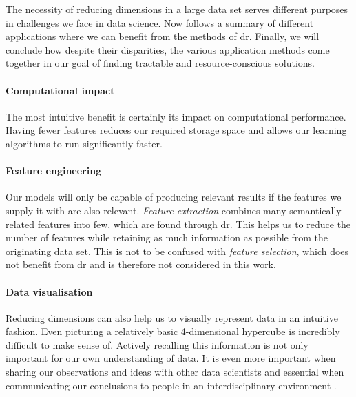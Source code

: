 The necessity of reducing dimensions in a large data set serves different purposes in challenges we face in data science. 
Now follows a summary of different applications where we can benefit from the methods of \acrlong{dr}.
Finally, we will conclude how despite their disparities, the various application methods come together in our goal of finding tractable and resource-conscious solutions.

\paragraph{Computational impact}

The most intuitive benefit is certainly its impact on computational performance.
Having fewer features reduces our required storage space and allows our learning algorithms to run significantly faster. \cite{PythonMachineLearningCh1}
\vspace{-5mm}

\paragraph{Feature engineering}

Our models will only be capable of producing relevant results if the features we supply it with are also relevant. \cite{HandsOnMLCh1}
\emph{Feature extraction} combines many semantically related features into few, which are found through \gls{dr}.
This helps us to reduce the number of features while retaining as much information as possible from the originating data set.
This is not to be confused with \emph{feature selection}, which does not benefit from \gls{dr} and is therefore not considered in this work.
\vspace{-5mm}

\paragraph{Data visualisation}

Reducing dimensions can also help us to visually represent data in an intuitive fashion.
Even picturing a relatively basic 4-dimensional hypercube is incredibly difficult to make sense of.
Actively recalling this information is not only important for our own understanding of data. It is even more important when sharing our observations and ideas with other data scientists and essential when communicating our conclusions to people in an interdisciplinary environment \cite{PythonMachineLearningCh5}.
\vspace{-5mm}

